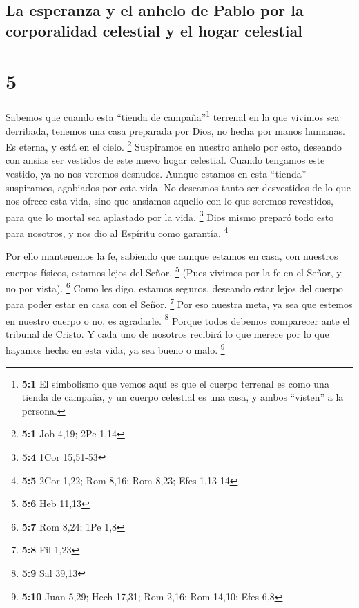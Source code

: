 \hypertarget{la-esperanza-y-el-anhelo-de-pablo-por-la-corporalidad-celestial-y-el-hogar-celestial}{%
\subsection{La esperanza y el anhelo de Pablo por la corporalidad
celestial y el hogar
celestial}\label{la-esperanza-y-el-anhelo-de-pablo-por-la-corporalidad-celestial-y-el-hogar-celestial}}

\hypertarget{section-4}{%
\section{5}\label{section-4}}

 Sabemos que cuando esta ``tienda de campaña''\footnote{\textbf{5:1}
  El simbolismo que vemos aquí es que el cuerpo terrenal es como una
  tienda de campaña, y un cuerpo celestial es una casa, y ambos
  ``visten'' a la persona.} terrenal en la que vivimos sea derribada,
tenemos una casa preparada por Dios, no hecha por manos humanas. Es
eterna, y está en el cielo. \footnote{\textbf{5:1} Job 4,19; 2Pe 1,14}
 Suspiramos en nuestro anhelo por esto, deseando con
ansias ser vestidos de este nuevo hogar celestial.  Cuando
tengamos este vestido, ya no nos veremos desnudos.  Aunque
estamos en esta ``tienda'' suspiramos, agobiados por esta vida. No
deseamos tanto ser desvestidos de lo que nos ofrece esta vida, sino que
ansiamos aquello con lo que seremos revestidos, para que lo mortal sea
aplastado por la vida. \footnote{\textbf{5:4} 1Cor 15,51-53}
 Dios mismo preparó todo esto para nosotros, y nos dio al
Espíritu como garantía. \footnote{\textbf{5:5} 2Cor 1,22; Rom 8,16; Rom
  8,23; Efes 1,13-14}

 Por ello mantenemos la fe, sabiendo que aunque estamos en
casa, con nuestros cuerpos físicos, estamos lejos del Señor. \footnote{\textbf{5:6}
  Heb 11,13}  (Pues vivimos por la fe en el Señor, y no
por vista). \footnote{\textbf{5:7} Rom 8,24; 1Pe 1,8} 
Como les digo, estamos seguros, deseando estar lejos del cuerpo para
poder estar en casa con el Señor. \footnote{\textbf{5:8} Fil 1,23}
 Por eso nuestra meta, ya sea que estemos en nuestro
cuerpo o no, es agradarle. \footnote{\textbf{5:9} Sal 39,13}
 Porque todos debemos comparecer ante el tribunal de
Cristo. Y cada uno de nosotros recibirá lo que merece por lo que hayamos
hecho en esta vida, ya sea bueno o malo. \footnote{\textbf{5:10} Juan
  5,29; Hech 17,31; Rom 2,16; Rom 14,10; Efes 6,8}

